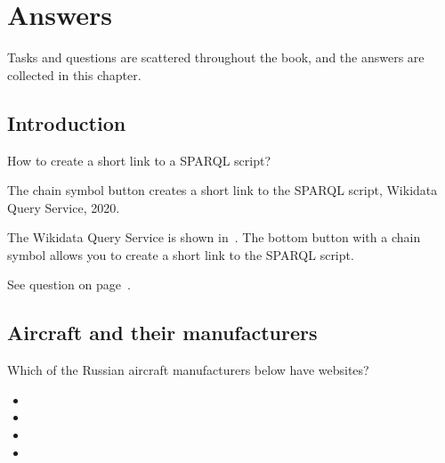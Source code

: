 \setchapterpreamble[u]{\margintoc}
\chapter{Answers}


Tasks and questions are scattered throughout the book, 
and the answers are collected in this chapter.


\section{Introduction}


\begin{exercise}%
    \label{answer:short-link-to-SPARQL}
How to create a short link to a SPARQL script?
\end{exercise}

\begin{marginfigure}[0cm]
    {%
        \setlength{\fboxsep}{0pt}
        \setlength{\fboxrule}{1pt}
    }
	\caption{The chain symbol button creates a short link to the SPARQL script, Wikidata Query Service, 2020.}
\end{marginfigure}

The Wikidata Query Service is shown in~. 
The bottom button with a chain symbol allows you to create a short link to the SPARQL script. 

See question on page~\pageref{question:short-link-to-SPARQL}.



\section{Aircraft and their manufacturers}


\begin{exercise}%
    \label{answer:aircraft_manufacturers_en}
Which of the Russian aircraft manufacturers below have websites?
\begin{itemize}
\item {}
\item {}
\item {}
\item {}
\end{itemize}
\end{exercise}

